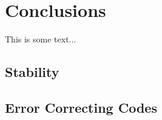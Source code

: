 
\chapter{Conclusions}
\label{chap:conclusion}
%

This is some text...

\section{Stability}

\section{Error Correcting Codes}
